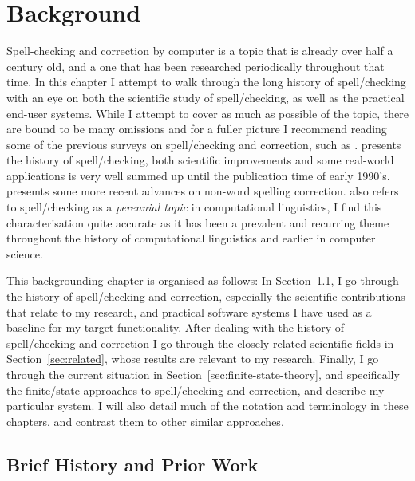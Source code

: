 \documentclass[officiallayout]{unihelcompling}
\begin{document}
\chapter{Background}
\label{chap:background}

Spell-checking and correction by computer is a topic that is already over half
a century old, and a one that has been researched periodically throughout that
time.  In this chapter I attempt to walk through the long history of
spell\-/checking with an eye on both the scientific study of spell\-/checking,
as well as the practical end-user systems. While I attempt to cover as
much as possible of the topic, there are bound to be many omissions and for
a fuller picture I recommend reading some of the previous surveys on
spell\-/checking and correction, such as
\citet{kukich1992spelling,mitton2009ordering}.  \citet{kukich1992spelling}
presents
the history of spell\-/checking, both scientific improvements and some
real-world applications is very well summed up until the publication time of
early 1990's.  \citet{mitton2009ordering} presemts some more recent advances on
non-word spelling correction.  \citet{kukich1992spelling} also refers to
spell\-/checking as a \emph{perennial topic} in computational linguistics, I
find this characterisation quite accurate as it has been a prevalent and
recurring theme throughout the history of computational linguistics and earlier
in computer science.


This backgrounding chapter is organised as follows: In
Section~\ref{sec:history}, I go through the history of spell\-/checking and
correction, especially the scientific contributions that relate to my research,
and practical software systems I have used as a baseline for my target
functionality.  After dealing with the history of spell\-/checking and
correction I go through the closely related scientific fields in
Section~\ref{sec:related}, whose results are relevant to my research. Finally,
I go through the current situation in Section~\ref{sec:finite-state-theory},
and specifically the finite\-/state approaches to spell\-/checking and
correction, and describe my particular system. I will also detail much of the
notation and terminology in these chapters, and contrast them to other similar
approaches.

\section{Brief History and Prior Work}
\label{sec:history}
\end{document}
